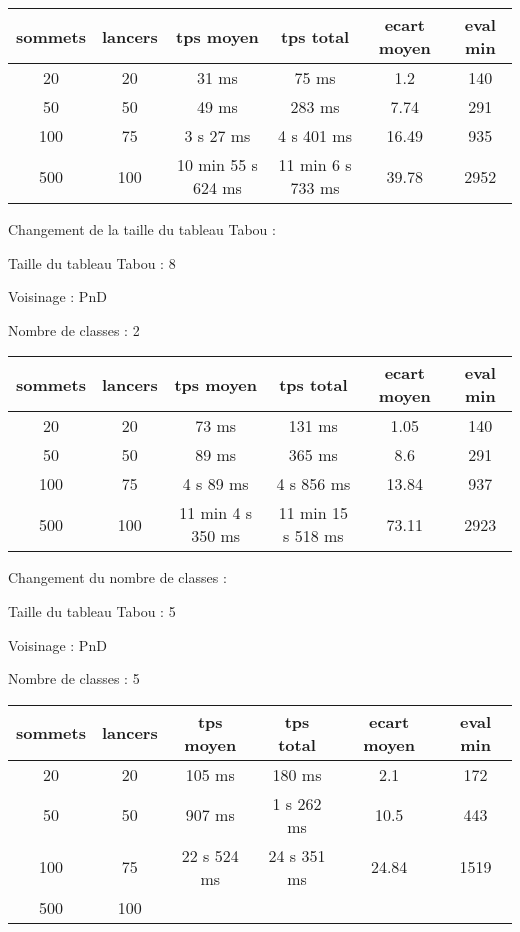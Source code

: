 \documentclass[12pt]{article}
\begin{document}
\begin{tabular}{|c|c|c|c|c|c|}
	\hline 
	sommets & lancers & tps moyen & tps total & ecart moyen & eval min\\
	\hline
	20 & 20 & 31 ms & 75 ms & 1.2 & 140 \\
	\hline
	 50 & 50 & 49 ms & 283 ms & 7.74 & 291 \\
	\hline
	 100 & 75 & 3 s 27 ms & 4 s 401 ms & 16.49 & 935 \\
	\hline
	 500 & 100 & 10 min 55 s 624 ms & 11 min 6 s 733 ms & 39.78 & 2952 \\
	\hline
\end{tabular}
\bigskip

Changement de la taille du tableau Tabou :

Taille du tableau Tabou : 8

Voisinage : PnD

Nombre de classes : 2
\bigskip

\begin{tabular}{|c|c|c|c|c|c|}
	\hline 
	sommets & lancers & tps moyen & tps total & ecart moyen & eval min\\
	\hline
	20 & 20 & 73 ms & 131 ms & 1.05 & 140 \\
	\hline
	 50  &  50  &   89  ms   &  365  ms   &  8.6   &   291  \\
	\hline
	 100  &  75  &  4 s 89   ms   &  4 s  856  ms    &  13.84   &   937  \\
	\hline
	 500 & 100 & 11 min 4 s 350 ms & 11 min 15 s 518 ms & 73.11 & 2923 \\
	\hline
\end{tabular}
\bigskip

Changement du nombre de classes :

Taille du tableau Tabou : 5

Voisinage : PnD

Nombre de classes : 5
\bigskip

\begin{tabular}{|c|c|c|c|c|c|}
	\hline 
	sommets & lancers & tps moyen & tps total & ecart moyen & eval min\\
	\hline
	20 & 20 & 105 ms & 180 ms & 2.1 & 172 \\
	\hline
	 50  &  50  &   907  ms   &  1  s  262  ms   &   10.5  &   443  \\
	\hline
	 100  &  75  & 22 s 524  ms   &  24 s  351  ms    &  24.84   &   1519  \\
	\hline
	 500  &  100  &     &      &     &     \\
	\hline
\end{tabular}
\bigskip
\end{document}
